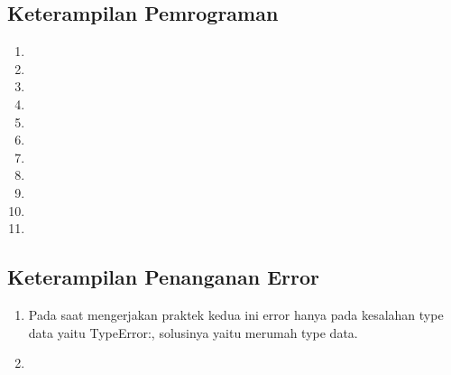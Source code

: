 \subsection{Keterampilan Pemrograman}
\begin{enumerate}
    \item 
    
    \item 
    
    \item 
    
    \item 
    
    \item 
    
    \item 
    
    \item 
    
    \item 
    
    \item 
    
    \item 
    
    \item 
    
\end{enumerate}

\subsection{Keterampilan Penanganan Error}
\begin{enumerate}
    \item Pada saat mengerjakan praktek kedua ini error hanya pada kesalahan type data yaitu TypeError:, solusinya yaitu merumah type data.
    
    \item 
    
\end{enumerate}

